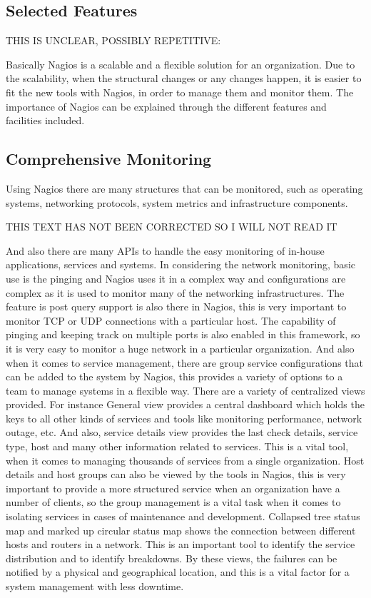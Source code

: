 \documentclass[9pt,twocolumn,twoside]{styles/osajnl}
\begin{document}
\subsection{Selected Features}

THIS IS UNCLEAR, POSSIBLY REPETITIVE:

Basically Nagios is a scalable and
a flexible solution for an organization. Due to the scalability, when
the structural changes or any changes happen, it is easier to fit the
new tools with Nagios, in order to manage them and monitor them. The
importance of Nagios can be explained through the different features
and facilities included.

\subsection{Comprehensive Monitoring}



Using Nagios there are many structures that can be monitored, such as
operating systems, networking protocols, system metrics and
infrastructure components. 

THIS TEXT HAS NOT BEEN CORRECTED SO I WILL NOT READ IT

And also there are many APIs to handle the
easy monitoring of in-house applications, services and systems. In
considering the network monitoring, basic use is the pinging and
Nagios uses it in a complex way and configurations are complex as it
is used to monitor many of the networking infrastructures. The feature
is post query support is also there in Nagios, this is very important
to monitor TCP or UDP connections with a particular host. The
capability of pinging and keeping track on multiple ports is also
enabled in this framework, so it is very easy to monitor a huge
network in a particular organization. And also when it comes to
service management, there are group service configurations that can be
added to the system by Nagios, this provides a variety of options to a
team to manage systems in a flexible way. There are a variety of
centralized views provided. For instance General view provides a
central dashboard which holds the keys to all other kinds of services
and tools like monitoring performance, network outage, etc. And also,
service details view provides the last check details, service type,
host and many other information related to services. This is a vital
tool, when it comes to managing thousands of services from a single
organization. Host details and host groups can also be viewed by the
tools in Nagios, this is very important to provide a more structured
service when an organization have a number of clients, so the group
management is a vital task when it comes to isolating services in
cases of maintenance and development. Collapsed tree status map and
marked up circular status map shows the connection between different
hosts and routers in a network. This is an important tool to identify
the service distribution and to identify breakdowns. By these views,
the failures can be notified by a physical and geographical location,
and this is a vital factor for a system management with less downtime.
\end{document}
